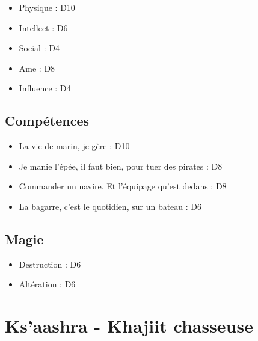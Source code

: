 \documentclass{Tamriel}
\begin{document}
\begin{multicols*}{2}
        \begin{itemize}
        \item Physique : D10
        \item Intellect : D6
        \item Social : D4
        \item Ame : D8
        \item Influence : D4
        \end{itemize}

        \section*{Compétences}

        \begin{itemize}
        \item La vie de marin, je gère : D10
        \item Je manie l'épée, il faut bien, pour tuer des pirates : D8
        \item Commander un navire. Et l'équipage qu'est dedans : D8
        \item La bagarre, c'est le quotidien, sur un bateau : D6
        \end{itemize}
        
        \section*{Magie}

        \begin{itemize}
        \item Destruction : D6
        \item Altération : D6
        \end{itemize}
        

\end{multicols*}

\chapter*{Ks'aashra - Khajiit chasseuse}
\end{document}
